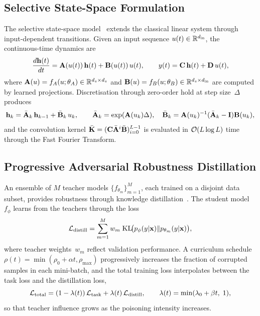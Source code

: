 \subsection{Selective State-Space Formulation}

The selective state-space model~\cite{Gu2022,Gu2024} extends the classical linear system through input-dependent transitions. Given an input sequence $u(t)\in\mathbb{R}^{d_{\mathrm{in}}}$, the continuous-time dynamics are
\begin{equation}
\frac{d\mathbf{h}(t)}{dt} = \mathbf{A}(u(t))\,\mathbf{h}(t) + \mathbf{B}(u(t))\,u(t),
\qquad
y(t) = \mathbf{C}\,\mathbf{h}(t) + \mathbf{D}\,u(t),
\label{eq:mamba_cts}
\end{equation}
where $\mathbf{A}(u)=f_A(u;\theta_A)\in\mathbb{R}^{d_s\times d_s}$ and $\mathbf{B}(u)=f_B(u;\theta_B)\in\mathbb{R}^{d_s\times d_{\mathrm{in}}}$ are computed by learned projections. Discretisation through zero-order hold at step size~$\Delta$ produces
\begin{equation}
\mathbf{h}_k = \bar{\mathbf{A}}_k\,\mathbf{h}_{k-1} + \bar{\mathbf{B}}_k\,u_k,
\qquad
\bar{\mathbf{A}}_k = \exp(\mathbf{A}(u_k)\Delta),
\quad
\bar{\mathbf{B}}_k = \mathbf{A}(u_k)^{-1}(\bar{\mathbf{A}}_k - \mathbf{I})\mathbf{B}(u_k),
\label{eq:mamba_disc}
\end{equation}
and the convolution kernel $\bar{\mathbf{K}}=(\mathbf{C}\bar{\mathbf{A}}^i\bar{\mathbf{B}})_{i=0}^{L-1}$ is evaluated in $\mathcal{O}(L\log L)$ time through the Fast Fourier Transform.

\subsection{Progressive Adversarial Robustness Distillation}

An ensemble of $M$ teacher models $\{f_{\theta_m}\}_{m=1}^M$, each trained on a disjoint data subset, provides robustness through knowledge distillation~\cite{Hinton2015,Xie2019}. The student model~$f_\phi$ learns from the teachers through the loss
\begin{equation}
\mathcal{L}_{\mathrm{distill}}
= \sum_{m=1}^{M}w_m\;\mathrm{KL}\!\bigl(p_\phi(y|\mathbf{x})\|p_{\theta_m}(y|\mathbf{x})\bigr),
\label{eq:mamba_distill}
\end{equation}
where teacher weights~$w_m$ reflect validation performance. A curriculum schedule $\rho(t)=\min(\rho_0+\alpha t,\rho_{\max})$ progressively increases the fraction of corrupted samples in each mini-batch, and the total training loss interpolates between the task loss and the distillation loss,
\begin{equation}
\mathcal{L}_{\mathrm{total}}
= (1-\lambda(t))\,\mathcal{L}_{\mathrm{task}}
+ \lambda(t)\,\mathcal{L}_{\mathrm{distill}},
\qquad
\lambda(t) = \min(\lambda_0+\beta t,\;1),
\label{eq:mamba_curriculum}
\end{equation}
so that teacher influence grows as the poisoning intensity increases.

